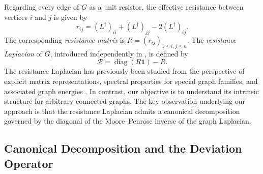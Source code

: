 \documentclass[12pt,a4paper]{amsart}
\theoremstyle{remark}
\theoremstyle{definition}
\newcommand{\1}{\mathbf{1}}
\newcommand{\0}{\mathbf{0}}
\begin{document}
Regarding every edge of $G$ as a unit resistor, the effective
resistance between vertices $i$ and $j$ is given by
\cite[Section~9.1]{Bapat2010}
\[
r_{ij}
=
(L^\dagger)_{ii}
+
(L^\dagger)_{jj}
-
2(L^\dagger)_{ij}.
\]
The corresponding \emph{resistance matrix} is $R=(r_{ij})_{1\leq i,j\leq n}.$ The \emph{resistance Laplacian} of $G$, introduced independently in
\cite{gupta2,parab2024}, is defined by
\begin{equation}
\mathcal{R}
=
\operatorname{diag}(R\mathbf{1})-R.
\label{eqn:resistance laplacian}
\end{equation}
The resistance Laplacian has previously been studied from the perspective of explicit matrix representations, spectral properties for special graph families, and associated graph energies \cite{parab2024}. 
In contrast, our objective is to understand its intrinsic structure for arbitrary connected graphs. 
The key observation underlying our approach is that the resistance Laplacian admits a canonical decomposition governed by the diagonal of the Moore--Penrose inverse of the graph Laplacian.



\subsection{Canonical Decomposition and the Deviation Operator}
\end{document}
